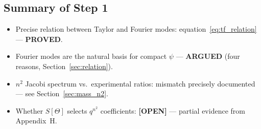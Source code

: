 \documentclass[12pt,a4paper]{article}
\theoremstyle{remark}
\begin{document}
\subsection{Summary of Step 1}

\begin{itemize}
  \item[\checkmark] Precise relation between Taylor and Fourier modes:
        equation~\eqref{eq:tf_relation} --- \textbf{PROVED}.
  \item[\checkmark] Fourier modes are the natural basis for compact
        $\psi$ --- \textbf{ARGUED} (four reasons, Section~\ref{sec:relation}).
  \item[\checkmark] $n^2$ Jacobi spectrum vs.\ experimental ratios:
        mismatch precisely documented --- see Section~\ref{sec:mass_n2}.
  \item[$\square$] Whether $S[\Theta]$ selects $q^{n^2}$ coefficients:
        \textbf{[OPEN]} --- partial evidence from Appendix~H.
\end{itemize}
\end{document}
